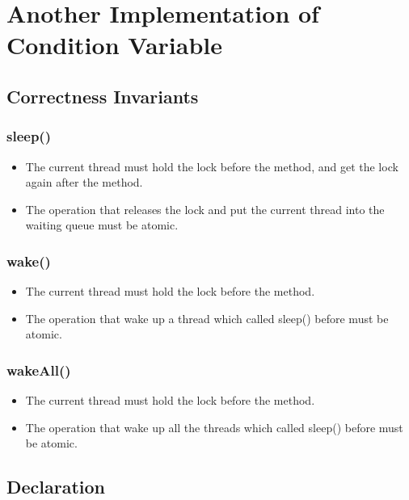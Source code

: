 \documentclass{article}
\begin{document}
	\section{Another Implementation of Condition Variable}
	
	\subsection{Correctness Invariants}
	
	\subsubsection*{sleep()}
	\begin{itemize}
		\item The current thread must hold the lock before the method, and get the lock again after the method.
		
		\item The operation that releases the lock and put the current thread into the waiting queue  must be atomic.
	\end{itemize}
	
	\subsubsection*{wake()}
	\begin{itemize}
		\item The current thread must hold the lock before the method.
			
		\item The operation that wake up a thread which called sleep() before must be atomic.
	\end{itemize}
	
	\subsubsection*{wakeAll()}
	\begin{itemize}
		\item The current thread must hold the lock before the method.
		
		\item The operation that wake up all the threads which called sleep() before must be atomic.
	\end{itemize}
	
	\subsection{Declaration}
	
\end{document}

